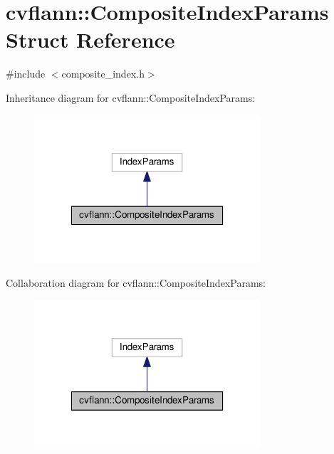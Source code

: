 \hypertarget{structcvflann_1_1CompositeIndexParams}{\section{cvflann\-:\-:Composite\-Index\-Params Struct Reference}
\label{structcvflann_1_1CompositeIndexParams}
}


{\ttfamily \#include $<$composite\-\_\-index.\-h$>$}



Inheritance diagram for cvflann\-:\-:Composite\-Index\-Params\-:\nopagebreak
\begin{figure}[H]
\begin{center}
\leavevmode
\includegraphics[width=238pt]{structcvflann_1_1CompositeIndexParams__inherit__graph}
\end{center}
\end{figure}


Collaboration diagram for cvflann\-:\-:Composite\-Index\-Params\-:\nopagebreak
\begin{figure}[H]
\begin{center}
\leavevmode
\includegraphics[width=238pt]{structcvflann_1_1CompositeIndexParams__coll__graph}
\end{center}
\end{figure}
